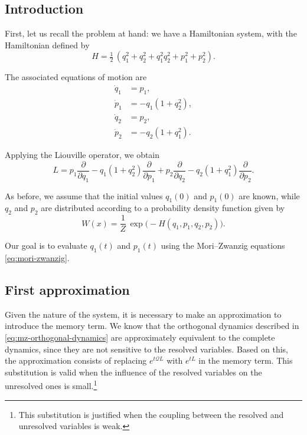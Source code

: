 \documentclass[12pt]{article}
\begin{document}
\subsection{Introduction}
First, let us recall the problem at hand: we have a Hamiltonian system, with the Hamiltonian defined by
\begin{equation*}
	H = \tfrac{1}{2}\,(q_1^2 + q_2^2 + q_1^2 q_2^2 + p_1^2 + p_2^2).
\end{equation*}

The associated equations of motion are
\begin{align*}
	\dot{q}_1 & = p_1, \nonumber             \\
	\dot{p}_1 & = -q_1(1 + q_2^2), \nonumber \\
	\dot{q}_2 & = p_2, \nonumber             \\
	\dot{p}_2 & = -q_2(1 + q_1^2).           
\end{align*}

Applying the Liouville operator, we obtain
\begin{equation*}
	L = p_1 \frac{\partial}{\partial q_1} 
	- q_1(1 + q_2^2)\frac{\partial}{\partial p_1}
	+ p_2 \frac{\partial}{\partial q_2} 
	- q_2(1 + q_1^2)\frac{\partial}{\partial p_2}.
\end{equation*}

As before, we assume that the initial values $q_1(0)$ and $p_1(0)$ are known, while $q_2$ and $p_2$ are distributed according to a probability density function given by
\begin{equation*}
	W(x) = \frac{1}{Z}\,\exp\!\big(-H(q_1,p_1,q_2,p_2)\big).
\end{equation*}

Our goal is to evaluate $q_1(t)$ and $p_1(t)$ using the Mori–Zwanzig equations \eqref{eq:mori-zwanzig}.


\subsection{First approximation}
Given the nature of the system, it is necessary to make an approximation to introduce the memory term. We know that the orthogonal dynamics described in \eqref{eq:mz-orthogonal-dynamics} are approximately equivalent to the complete dynamics, since they are not sensitive to the resolved variables. Based on this, the approximation consists of replacing $e^{t\mathcal{Q}L}$ with $e^{tL}$ in the memory term. This substitution is valid when the influence of the resolved variables on the unresolved ones is small.\footnote{This substitution is justified when the coupling between the resolved and unresolved variables is weak.} 
\end{document}
